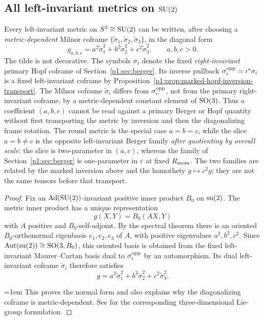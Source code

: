 \documentclass[11pt]{article}
\begin{document}
\subsection{All left-invariant metrics on \texorpdfstring{\(\mathrm{SU}(2)\)}{SU(2)}}
\label{p1:subsec:left-invariant-metrics}

\begin{proposition}
\label{p1a:proposition:atlas-milnor-normal-form-0d88235}

Every left-invariant metric on \(S^3\cong \mathrm{SU}(2)\) can be written, after
choosing a \emph{metric-dependent} Milnor coframe
\(\{\tilde\sigma_1,\tilde\sigma_2,\tilde\sigma_3\}\), in the diagonal form
\[
g_{a,b,c}=a^2\tilde\sigma_1^2+b^2\tilde\sigma_2^2+c^2\tilde\sigma_3^2,
\qquad a,b,c>0.
\]
The tilde is not decorative.  The symbols \(\sigma_i\) denote the fixed
\emph{right-invariant} primary Hopf coframe of
Section~\ref{p1:sec:berger}.  Its inverse pullback
\(\sigma_i^{\rm opp}=\iota^*\sigma_i\) is a fixed left-invariant
coframe by Proposition~\ref{p1:prop:marked-hopf-inversion-transport}.
The Milnor coframe \(\tilde\sigma_i\) differs from
\(\sigma_i^{\rm opp}\), not from the primary right-invariant coframe,
by a metric-dependent constant element of \(\mathrm{SO}(3)\).
Thus a coefficient \((a,b,c)\) cannot be read against a primary Berger or
Hopf quantity without first transporting the metric by inversion and then
the diagonalizing frame rotation.
The round metric is the special case \(a=b=c\), while the slice \(a=b\neq c\)
is the opposite left-invariant Berger family \emph{after quotienting by overall scale}: the slice is
two-parameter in \((a,c)\), whereas the family of
Section~\ref{p1:sec:berger} is one-parameter in \(\varepsilon\) at fixed
\(R_{\mathrm{mom}}\).  The two families are related by the marked inversion above and the homothety
\(g\mapsto c^2g\); they are not the same tensors before that transport.
\end{proposition}

\begin{proof}
Fix an \(\operatorname{Ad}(\mathrm{SU}(2))\)-invariant positive inner product \(B_0\) on
\(\operatorname{su}(2)\).  The metric inner product has a unique representation
\[
  g(X,Y)=B_0(AX,Y)
\]
with \(A\) positive and \(B_0\)-self-adjoint.  By the spectral theorem there is
an oriented \(B_0\)-orthonormal eigenbasis \(e_1,e_2,e_3\) of \(A\), with
positive eigenvalues \(a^2,b^2,c^2\).  Since
\(\operatorname{Aut}(\operatorname{su}(2))\cong\mathrm{SO}(3,B_0)\), this oriented basis is obtained from the fixed
left-invariant Maurer--Cartan basis dual to \(\sigma_i^{\rm opp}\) by an automorphism.  Its dual left-invariant coframe
\(\tilde\sigma_i\) therefore satisfies
\[
  g=a^2\tilde\sigma_1^2+b^2\tilde\sigma_2^2+c^2\tilde\sigma_3^2.
\]
{\emergencystretch=1em
This proves the normal form and also explains why the diagonalizing coframe is
metric-dependent.  See \cite{Milnor1976} for the corresponding
three-dimensional Lie-group formulation.\par}
\end{proof}
\end{document}
